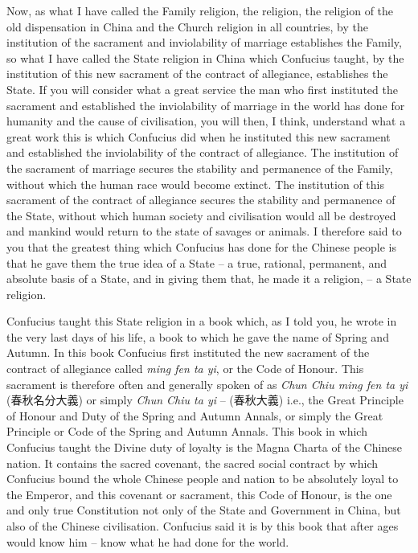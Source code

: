 Now, as what I have called the Family religion, the religion, the religion of the old dispensation in China and the Church religion in all countries, by the institution of the sacrament and inviolability of marriage establishes the Family, so what I have called the State religion in China which Confucius taught, by the institution of this new sacrament of the contract of allegiance, establishes the State. If you will consider what a great service the man who first instituted the sacrament and established the inviolability of marriage in the world has done for humanity and the cause of civilisation, you will then, I think, understand what a great work this is which Confucius did when he instituted this new sacrament and established the inviolability of the contract of allegiance. The institution of the sacrament of marriage secures the stability and permanence of the Family, without which the human race would become extinct. The institution of this sacrament of the contract of allegiance secures the stability and permanence of the State, without which human society and civilisation would all be destroyed and mankind would return to the state of savages or animals. I therefore said to you that the greatest thing which Confucius has done for the Chinese people is that he gave them the true idea of a State -- a true, rational, permanent, and absolute basis of a State, and in giving them that, he made it a religion,  -- a State religion.

Confucius taught this State religion in a book which, as I told you, he wrote in the very last days of his life, a book to which he gave the name of Spring and Autumn. In this book Confucius first instituted the new sacrament of the contract of allegiance called \emph{ming fen ta yi}, or the Code of Honour. This sacrament is therefore often and generally spoken of as \emph{Chun Chiu ming fen ta yi} (春秋名分大義) or simply \emph{Chun Chiu ta yi} -- (春秋大義) i.e., the Great Principle of Honour and Duty of the Spring and Autumn Annals, or simply the Great Principle or Code of the Spring and Autumn Annals. This book in which Confucius taught the Divine duty of loyalty is the Magna Charta of the Chinese nation. It contains the sacred covenant, the sacred social contract by which Confucius bound the whole Chinese people and nation to be absolutely loyal to the Emperor, and this covenant or sacrament, this Code of Honour, is the one and only true Constitution not only of the State and Government in China, but also of the Chinese civilisation. Confucius said it is by this book that after ages would know him -- know what he had done for the world.

